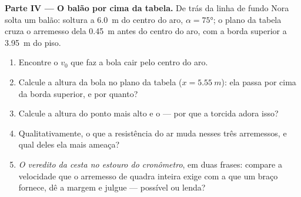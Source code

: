 \begin{problem}
\medskip\noindent\textbf{Parte IV --- O balão por cima da tabela.} De trás da linha de
fundo Nora solta um balão: soltura a \qty{6.0}{m} do centro do aro,
$\alpha = \ang{75}$; o plano da tabela cruza o arremesso dela \qty{0.45}{m} antes do
centro do aro, com a borda superior a \qty{3.95}{m} do piso.
\begin{enumerate}[resume]
  \item Encontre o $v_0$ que faz a bola cair pelo centro do aro.
  \item Calcule a altura da bola no plano da tabela ($x = \qty{5.55}{m}$): ela passa
        por cima da borda superior, e por quanto?
  \item Calcule a altura do ponto mais alto e o  --- por que a torcida
        adora isso?
  \item Qualitativamente, o que a resistência do ar muda nesses três arremessos, e
        qual deles ela mais ameaça?
  \item \emph{O veredito da cesta no estouro do cronômetro}, em duas frases: compare a
        velocidade que o arremesso de quadra inteira exige com a que um braço fornece,
        dê a margem e julgue --- possível ou lenda?
\end{enumerate}
\end{problem}
